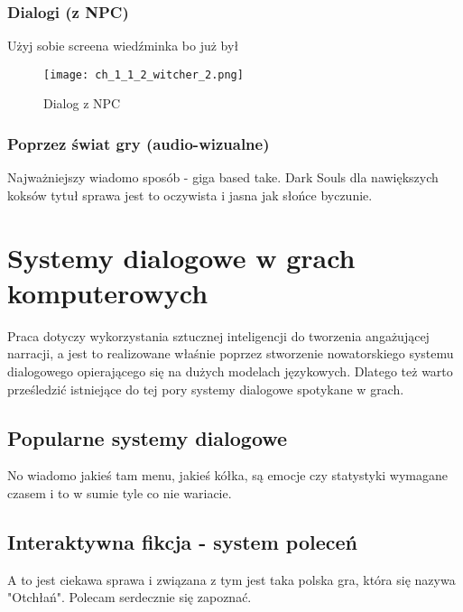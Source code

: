 \subsubsection*{Dialogi (z NPC)}

Użyj sobie screena wiedźminka bo już był

\begin{figure}[h]
	\caption{Dialog z NPC}
	\texttt{[image: ch\_1\_1\_2\_witcher\_2.png]}
	\centering
	\label{fig:ch1_2_2_dialogue}
\end{figure}

\subsubsection*{Poprzez świat gry (audio-wizualne)}

Najważniejszy wiadomo sposób - giga based take. Dark Souls dla nawiększych koksów tytuł sprawa
jest to oczywista i jasna jak słońce byczunie.

\newpage

\section{Systemy dialogowe w grach komputerowych}\label{section:ch1_3}

Praca dotyczy wykorzystania sztucznej inteligencji do tworzenia angażującej narracji, a jest
to realizowane właśnie poprzez stworzenie nowatorskiego systemu dialogowego opierającego się
na dużych modelach językowych. Dlatego też warto prześledzić istniejące do tej pory systemy
dialogowe spotykane w grach.

\subsection{Popularne systemy dialogowe}\label{subsection:ch1_3_1}

No wiadomo jakieś tam menu, jakieś kółka, są emocje czy statystyki wymagane czasem i to w sumie
tyle co nie wariacie.

\subsection{Interaktywna fikcja - system poleceń}\label{subsection:ch1_3_2}

A to jest ciekawa sprawa i związana z tym jest taka polska gra, która się nazywa "Otchłań".
Polecam serdecznie się zapoznać.